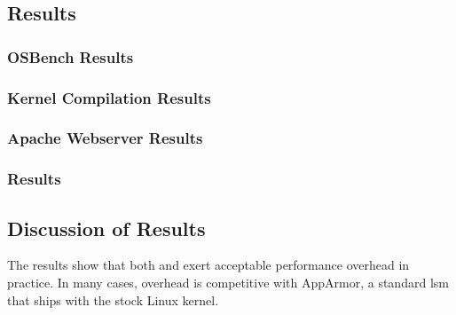\subsection{Results}%
\label{ss:eval-results}


\subsubsection{OSBench Results}

\subsubsection{Kernel Compilation Results}

\subsubsection{Apache Webserver Results}

\subsubsection{ Results}

\subsection{Discussion of Results}%
\label{ss:eval-performance-discussion}

The results show that both \bpfbox{} and \bpfcontain{} exert acceptable performance
overhead in practice. In many cases, overhead is competitive with AppArmor, a standard
\gls{lsm} that ships with the stock Linux kernel. 

